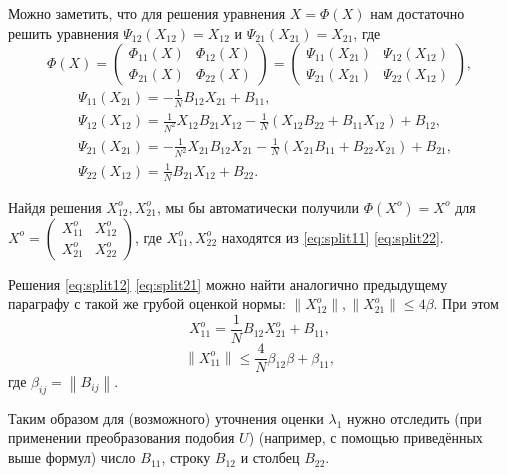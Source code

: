 Можно заметить, что для решения уравнения \( X = \Phi(X) \)
нам достаточно решить уравнения \( \Psi_{12}(X_{12}) = X_{12} \) и \( \Psi_{21}(X_{21}) = X_{21} \),
где
\[
    \Phi(X) =
    \begin{pmatrix}
        \Phi_{11}(X) & \Phi_{12}(X) \\
        \Phi_{21}(X) & \Phi_{22}(X)
    \end{pmatrix} =
    \begin{pmatrix}
        \Psi_{11}(X_{21}) & \Psi_{12}(X_{12}) \\
        \Psi_{21}(X_{21}) & \Psi_{22}(X_{12})
    \end{pmatrix},
\]
\begin{subequations}
    \begin{align}
        \label{eq:split11}
        & \Psi_{11}(X_{21}) = -\frac1N B_{12}X_{21} + B_{11}, \\
        \label{eq:split12}
        & \Psi_{12}(X_{12}) = \frac{1}{N^2} X_{12}B_{21}X_{12} -
                                   \frac1N\left(X_{12}B_{22} +
                                   B_{11}X_{12}\right) + B_{12}, \\
        \label{eq:split21}
        & \Psi_{21}(X_{21}) = -\frac{1}{N^2} X_{21}B_{12}X_{21} -
                                   \frac1N\left(X_{21}B_{11} +
                                   B_{22}X_{21}\right) +
                                   B_{21}, \\
        \label{eq:split22}
        & \Psi_{22}(X_{12}) = \frac1N B_{21}X_{12} + B_{22}.
    \end{align}
\end{subequations}

Найдя решения \( X_{12}^o, X_{21}^o \),
мы бы автоматически получили
\( \Phi(X^o) = X^o \) для
\( X^o =
\left(\begin{smallmatrix}
    X_{11}^o & X_{12}^o \\
    X_{21}^o & X_{22}^o
\end{smallmatrix}\right) \),
где \( X_{11}^o, X_{22}^o \) находятся из \eqref{eq:split11} \eqref{eq:split22}.

Решения \eqref{eq:split12} \eqref{eq:split21} можно найти аналогично предыдущему параграфу
с такой же грубой оценкой нормы: \( {\left\|X_{12}^o\right\|}, {\left\|X_{21}^o\right\|} \leq 4\beta \).
При этом
\[ X_{11}^o = \frac1N B_{12} X_{21}^o + B_{11}, \]
\[ {\left\|X_{11}^o\right\|} \leq \frac4N \beta_{12}\beta + \beta_{11}, \]
где \( \beta_{ij} = {\left\|B_{ij}\right\|} \).

Таким образом для (возможного) уточнения оценки \( \lambda_1 \)
нужно отследить (при применении преобразования подобия \( U \)) (например, с помощью приведённых выше формул)
число \( B_{11} \), строку \( B_{12} \) и столбец \( B_{22} \).
